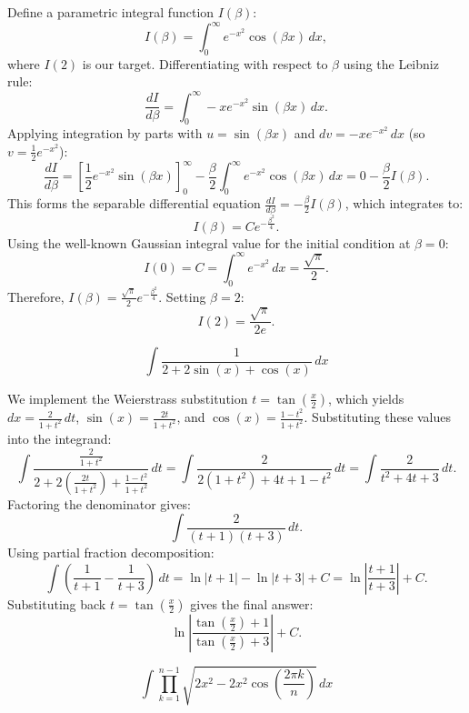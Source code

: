 \begin{questions}
    \begin{solution}
    Define a parametric integral function $I(\beta)$:
    \[ I(\beta) = \int_{0}^{\infty} e^{-x^{2}}\cos(\beta x) \, dx, \]
    where $I(2)$ is our target. Differentiating with respect to $\beta$ using the Leibniz rule:
    \[ \frac{dI}{d\beta} = \int_{0}^{\infty} -xe^{-x^{2}}\sin(\beta x) \, dx. \]
    Applying integration by parts with $u = \sin(\beta x)$ and $dv = -xe^{-x^2} \, dx$ (so $v = \frac{1}{2}e^{-x^2}$):
    \[ \frac{dI}{d\beta} = \left[ \frac{1}{2}e^{-x^2}\sin(\beta x) \right]_0^\infty - \frac{\beta}{2}\int_{0}^{\infty} e^{-x^{2}}\cos(\beta x) \, dx = 0 - \frac{\beta}{2}I(\beta). \]
    This forms the separable differential equation $\frac{dI}{d\beta} = -\frac{\beta}{2}I(\beta)$, which integrates to:
    \[ I(\beta) = C e^{-\frac{\beta^{2}}{4}}. \]
    Using the well-known Gaussian integral value for the initial condition at $\beta = 0$:
    \[ I(0) = C = \int_{0}^{\infty} e^{-x^{2}} \, dx = \frac{\sqrt{\pi}}{2}. \]
    Therefore, $I(\beta) = \frac{\sqrt{\pi}}{2}e^{-\frac{\beta^{2}}{4}}$. Setting $\beta = 2$:
    \[ I(2) = \frac{\sqrt{\pi}}{2e}. \]
    \end{solution}

    \question
    \[ \int \frac{1}{2+2\sin(x)+\cos(x)} \, dx \]

    \begin{solution}
    We implement the Weierstrass substitution $t = \tan\left(\frac{x}{2}\right)$, which yields $dx = \frac{2}{1+t^{2}} \, dt$, $\sin(x) = \frac{2t}{1+t^{2}}$, and $\cos(x) = \frac{1-t^{2}}{1+t^{2}}$. Substituting these values into the integrand:
    \[ \int \frac{\frac{2}{1+t^{2}}}{2 + 2\left(\frac{2t}{1+t^{2}}\right) + \frac{1-t^{2}}{1+t^{2}}} \, dt = \int \frac{2}{2(1+t^2) + 4t + 1 - t^2} \, dt = \int \frac{2}{t^{2}+4t+3} \, dt. \]
    Factoring the denominator gives:
    \[ \int \frac{2}{(t+1)(t+3)} \, dt. \]
    Using partial fraction decomposition:
    \[ \int \left(\frac{1}{t+1} - \frac{1}{t+3}\right) \, dt = \ln|t+1| - \ln|t+3| + C = \ln\left|\frac{t+1}{t+3}\right| + C. \]
    Substituting back $t = \tan\left(\frac{x}{2}\right)$ gives the final answer:
    \[ \ln\left|\frac{\tan(\frac{x}{2})+1}{\tan(\frac{x}{2})+3}\right| + C. \]
    \end{solution}

    \question
    \[ \int \prod_{k=1}^{n-1} \sqrt{2x^{2}-2x^{2}\cos\left(\frac{2\pi k}{n}\right)} \, dx \]


\end{questions}
